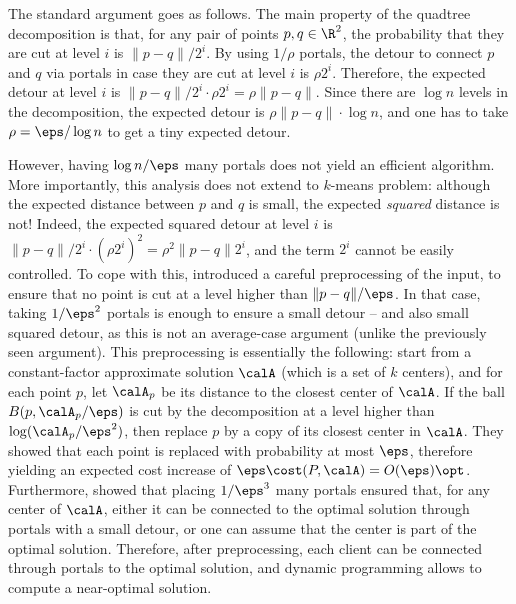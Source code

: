 The standard argument goes as follows. The main property of the quadtree decomposition is that, for any pair of points $p, q \in \R^2$, the probability that they are cut at level $i$ is $\|p-q\| / 2^i$. By using $1/\rho$ portals, the detour to connect $p$ and $q$ via portals in case they are cut at level $i$ is $\rho 2^i$.
Therefore, the expected detour at level $i$ is $\|p-q\| / 2^i \cdot \rho 2^i = \rho \|p-q\|$. Since there are $\log n$ levels in the decomposition, the expected detour is $\rho \|p-q\| \cdot \log n$, and one has to take $\rho = \eps / \log n$ to get a tiny expected detour.

However, having $\log n / \eps$ many portals does not yield an efficient algorithm. 
More importantly, this analysis does not extend to $k$-means problem: although the expected distance between $p$ and $q$ is small, the expected \emph{squared} distance is not! Indeed, the expected squared detour at level $i$ is $\|p-q\| / 2^i \cdot (\rho 2^{i})^2 = \rho^2 \|p-q\| 2^i$, and the term $2^i$ cannot be easily controlled.
To cope with this, \cite{jacm} introduced a careful preprocessing of the input, to ensure that no point is cut at a level higher than $\|p-q\|/\eps$. In that case, taking $1/\eps^2$ portals is enough to ensure a small detour -- and also small squared detour, as this is not an average-case argument (unlike the previously seen argument). This preprocessing is essentially the following: start from a constant-factor approximate solution $\calA$ (which is a set of $k$ centers), and for each point $p$, let $\calA_p$ be its distance to the closest center of $\calA$. 
If the ball $B(p, \calA_p/\eps)$ is cut by the decomposition at a level higher than $\log(\calA_p/\eps^2)$, then replace $p$ by a copy of its closest center in $\calA$. They showed that each point is replaced with probability at most $\eps$, therefore yielding an expected cost increase of $\eps \cost(P, \calA) = O(\eps)\opt$. 
Furthermore, \cite{jacm} showed that placing $1/\eps^3$ many portals ensured that,  for any center of $\calA$, either it can be connected to the optimal solution through portals with a small detour, or one can assume that the center is part of the optimal solution. Therefore, after preprocessing, each client can be connected through portals to the optimal solution, and dynamic programming allows to compute a near-optimal solution.

